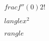 \documentclass[preview]{standalone}
\begin{document}
\begin{align*}
\quad\\frac{f''(0)}{2!}\quad\\\quad\\langle x^2 \quad\\\quad\\rangle
\end{align*}
\end{document}
